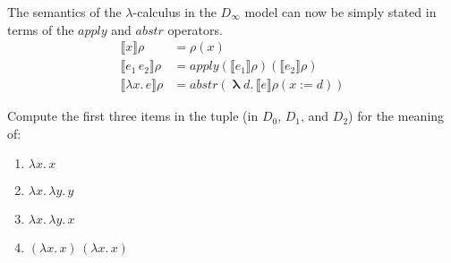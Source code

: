 \documentclass{tufte-handout}
\newcommand{\SEM}[1]{\llbracket #1 \rrbracket}
\newcommand{\LAM}[1]{\lambda #1.\,}
\newcommand{\MLAM}[1]{\boldsymbol\uplambda #1.\,}
\newcommand{\APP}[0]{\,}
\newcommand{\by}[0]{\!:=\!}
\begin{document}
The semantics of the $\lambda$-calculus in the $D_\infty$ model can
now be simply stated in terms of the $\mathit{apply}$ and
$\mathit{abstr}$ operators.
\begin{align*}
  \SEM{x}\rho &= \rho(x) \\
  \SEM{e_1 \APP e_2}\rho &= \mathit{apply}(\SEM{e_1}\rho)(\SEM{e_2}\rho) \\
  \SEM{\LAM{x} e}\rho &= \mathit{abstr}(\MLAM{d} \SEM{e}\rho(x\by d))
\end{align*}

\begin{Exercise}
  Compute the first three items in the tuple (in $D_0$, $D_1$, and
  $D_2$) for the meaning of:
  \begin{enumerate}
  \item $\LAM{x}x$
  \item $\LAM{x}\LAM{y}y$
  \item $\LAM{x}\LAM{y}x$
  \item $(\LAM{x}x) \APP (\LAM{x}x)$
  \end{enumerate}
\end{Exercise}
\end{document}
